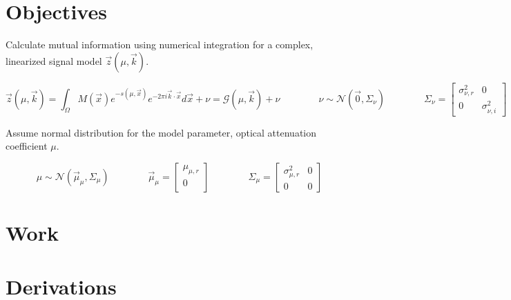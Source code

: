 \documentclass{article}         %
\theoremstyle{definition}
\theoremstyle{remark}
\begin{document}

\section{Objectives}\label{Objectives}

Calculate mutual information using numerical integration for a complex, linearized signal model $\vec{z}\left(\mu,\vec{k}\right)$.

\begin{equation}
	\vec{z}\left(\mu,\vec{k}\right) = \int_\Omega M\left(\vec{x}\right) e^{-s\left(\mu ,\vec{x}\right)}e^{-2\pi i\vec{k}\cdot\vec{x}}d\vec{x}+\nu=\mathcal{G}\left(\mu,\vec{k}\right)+\nu
	\qquad\qquad \nu\sim\mathcal{N}\left(\vec{0},\Sigma_\nu\right)
	\qquad\qquad \Sigma_\nu = \left[ \begin{array}{cc} 
		\sigma_{\nu,r}^2 & 0 \\
		0 & \sigma_{\nu,i}^2 \end{array} \right]
\end{equation}

Assume normal distribution for the model parameter, optical attenuation coefficient $\mu$.

\begin{equation}
	\mu\sim\mathcal{N}\left(\vec{\mu}_\mu,\Sigma_\mu\right)
	\qquad\qquad \vec{\mu}_\mu=\left[ \begin{array}{c}
		\mu_{\mu,r} \\ 0 \\ \end{array} \right]
	\qquad\qquad \Sigma_\mu=\left[\begin{array}{cc}
		\sigma_{\mu,r}^2 & 0 \\
		0 & 0 \end{array} \right]
\end{equation}

\section{Work}\label{Work}



\section{Derivations}\label{Derivations}
\end{document}
